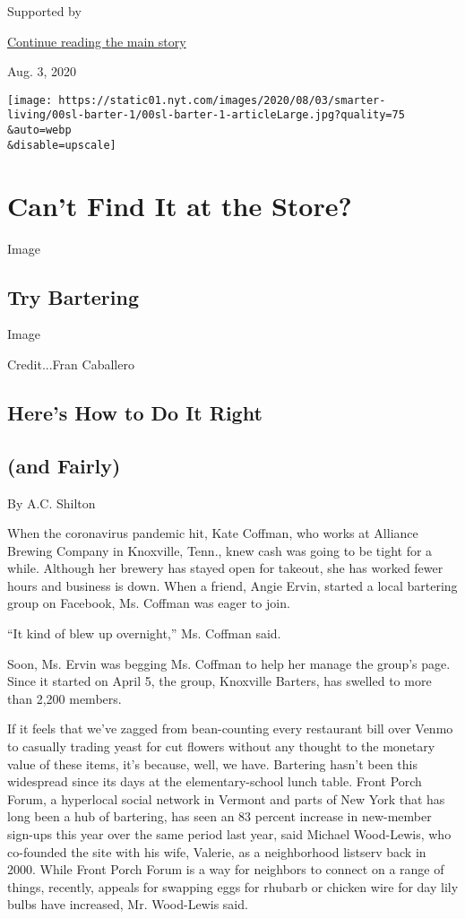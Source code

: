 Supported by

\protect\hyperlink{after-sponsor}{Continue reading the main story}

Aug. 3, 2020

\texttt{[image: https://static01.nyt.com/images/2020/08/03/smarter-living/00sl-barter-1/00sl-barter-1-articleLarge.jpg?quality=75\\\&auto=webp\\\&disable=upscale]}

\hypertarget{cant-find-it-at-the-store}{%
\section{Can't Find It at the Store?}\label{cant-find-it-at-the-store}}

Image

\hypertarget{try-bartering}{%
\subsection{Try Bartering}\label{try-bartering}}

Image

Credit...Fran Caballero

\hypertarget{heres-how-to-do-it-right}{%
\subsection{Here's How to Do It Right}\label{heres-how-to-do-it-right}}

\hypertarget{and-fairly}{%
\subsection{(and Fairly)}\label{and-fairly}}

By A.C. Shilton

When the coronavirus pandemic hit, Kate Coffman, who works at Alliance
Brewing Company in Knoxville, Tenn., knew cash was going to be tight for
a while. Although her brewery has stayed open for takeout, she has
worked fewer hours and business is down. When a friend, Angie Ervin,
started a local bartering group on Facebook, Ms. Coffman was eager to
join.

``It kind of blew up overnight,'' Ms. Coffman said.

Soon, Ms. Ervin was begging Ms. Coffman to help her manage the group's
page. Since it started on April 5, the group, Knoxville Barters, has
swelled to more than 2,200 members.

If it feels that we've zagged from bean-counting every restaurant bill
over Venmo to casually trading yeast for cut flowers without any thought
to the monetary value of these items, it's because, well, we have.
Bartering hasn't been this widespread since its days at the
elementary-school lunch table. Front Porch Forum, a hyperlocal social
network in Vermont and parts of New York that has long been a hub of
bartering, has seen an 83 percent increase in new-member sign-ups this
year over the same period last year, said Michael Wood-Lewis, who
co-founded the site with his wife, Valerie, as a neighborhood listserv
back in 2000. While Front Porch Forum is a way for neighbors to connect
on a range of things, recently, appeals for swapping eggs for rhubarb or
chicken wire for day lily bulbs have increased, Mr. Wood-Lewis said.

